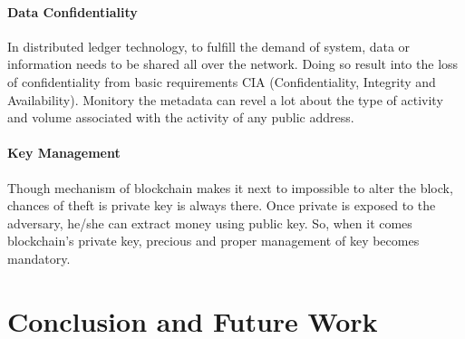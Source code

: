 \documentclass[a4paper,twoside,12pt]{report}
\begin{document}
\begin{spacing}{1.5}
\subsubsection{Data Confidentiality}
In distributed ledger technology, to fulfill the demand of system, data or information needs to be shared all over the network. Doing so result into the loss of confidentiality from basic requirements CIA (Confidentiality, Integrity and Availability). Monitory the metadata can revel a lot about the type of activity and volume associated with the activity of any public address.
\subsubsection{Key Management}
Though mechanism of blockchain makes it next to impossible to alter the block, chances of theft is private key is always there. Once private is exposed to the adversary, he/she can extract money using public key. So, when it comes blockchain's private key, precious and proper management of key becomes mandatory.
\chapter{Conclusion and Future Work}
\end{spacing}
\begin{appendices}
\end{appendices}



\end{document}
